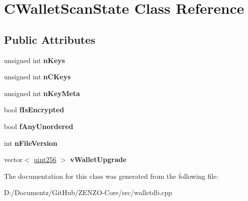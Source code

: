 \hypertarget{class_c_wallet_scan_state}{}\section{C\+Wallet\+Scan\+State Class Reference}
\label{class_c_wallet_scan_state}
\subsection*{Public Attributes}
\begin{DoxyCompactItemize}
\item 
\mbox{\label{class_c_wallet_scan_state_a8a6e0071320cbfffc6d7d49ded5d506e}} 
unsigned int {\bfseries n\+Keys}
\item 
\mbox{\label{class_c_wallet_scan_state_ae1316ee4cfdf8fbff91ca32a5d0f2b6a}} 
unsigned int {\bfseries n\+C\+Keys}
\item 
\mbox{\label{class_c_wallet_scan_state_a2cfbc8894839188b57be22e72f2d6de4}} 
unsigned int {\bfseries n\+Key\+Meta}
\item 
\mbox{\label{class_c_wallet_scan_state_a13c5139c5966079d1be4c739666c5243}} 
bool {\bfseries f\+Is\+Encrypted}
\item 
\mbox{\label{class_c_wallet_scan_state_acafa7b6a27ec1a4714e9a7b331067e9d}} 
bool {\bfseries f\+Any\+Unordered}
\item 
\mbox{\label{class_c_wallet_scan_state_ad68ce61566ee2baf3d7b04b1390942d1}} 
int {\bfseries n\+File\+Version}
\item 
\mbox{\label{class_c_wallet_scan_state_a6cbf626ca5a0275f0469684f22dff12f}} 
vector$<$ \mbox{\hyperlink{classuint256}{uint256}} $>$ {\bfseries v\+Wallet\+Upgrade}
\end{DoxyCompactItemize}


The documentation for this class was generated from the following file\+:\begin{DoxyCompactItemize}
\item 
D\+:/\+Documentz/\+Git\+Hub/\+Z\+E\+N\+Z\+O-\/\+Core/src/walletdb.\+cpp\end{DoxyCompactItemize}
